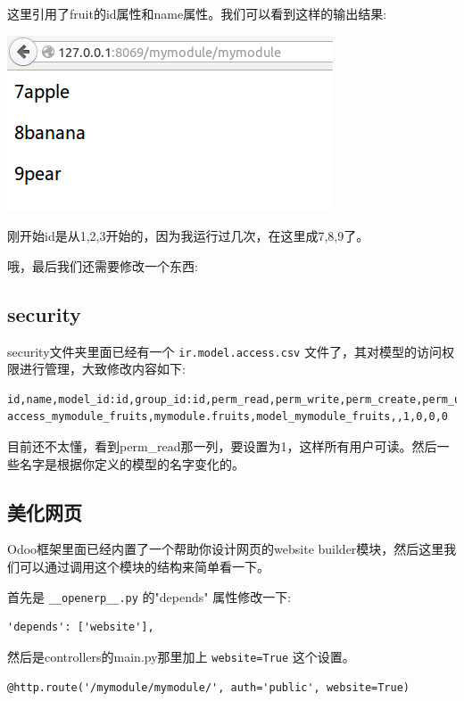 \documentclass[11pt,a4paper]{sphinxmanual}
\begin{document}
这里引用了fruit的id属性和name属性。我们可以看到这样的输出结果:

\includegraphics[keepaspectratio,max width=0.95\linewidth]{images/mymodule_index2.png}


刚开始id是从1,2,3开始的，因为我运行过几次，在这里成7,8,9了。

哦，最后我们还需要修改一个东西:


\subsection{security}
\label{sec-5-3-4}
security文件夹里面已经有一个 \verb~ir.model.access.csv~ 文件了，其对模型的访问权限进行管理，大致修改内容如下:

\begin{Verbatim}
id,name,model_id:id,group_id:id,perm_read,perm_write,perm_create,perm_unlink
access_mymodule_fruits,mymodule.fruits,model_mymodule_fruits,,1,0,0,0
\end{Verbatim}

目前还不太懂，看到perm\_read那一列，要设置为1，这样所有用户可读。然后一些名字是根据你定义的模型的名字变化的。


\subsection{美化网页}
\label{sec-5-3-5}
Odoo框架里面已经内置了一个帮助你设计网页的website builder模块，然后这里我们可以通过调用这个模块的结构来简单看一下。

首先是 \verb~__openerp__.py~ 的"depends" 属性修改一下:
\begin{Verbatim}
'depends': ['website'],
\end{Verbatim}

然后是controllers的main.py那里加上 \verb~website=True~ 这个设置。
\begin{Verbatim}
@http.route('/mymodule/mymodule/', auth='public', website=True)
\end{Verbatim}
\end{document}
